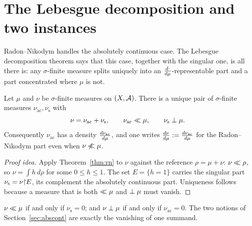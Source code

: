 \section{The Lebesgue decomposition and two instances}
\label{sec:lebesgue}

Radon--Nikodym handles the absolutely continuous case. The Lebesgue
decomposition theorem says that this case, together with the singular one, is
all there is: any $\sigma$-finite measure splits uniquely into an
$\frac{d \cdot}{d \mu}$-representable part and a part concentrated where $\mu$ is not.

\begin{theorem}
\label{thm:lebesgue}
Let $\mu$ and $\nu$ be $\sigma$-finite measures on $(X, \mathcal{A})$. There is a
unique pair of $\sigma$-finite measures $\nu_{\mathrm{ac}}, \nu_{\mathrm{s}}$
with
\begin{equation}
  \nu = \nu_{\mathrm{ac}} + \nu_{\mathrm{s}},
  \qquad \nu_{\mathrm{ac}} \ll \mu,
  \qquad \nu_{\mathrm{s}} \perp \mu.
  \label{eq:lebesgue}
\end{equation}
Consequently $\nu_{\mathrm{ac}}$ has a density $\frac{d \nu_{\mathrm{ac}}}{d \mu}$, and
one writes $\frac{d \nu}{d \mu} := \frac{d \nu_{\mathrm{ac}}}{d \mu}$ for the
Radon--Nikodym part even when $\nu \not\ll \mu$.
\end{theorem}

\begin{proof}[Proof idea]
Apply Theorem~\ref{thm:rn} to $\nu$ against the reference $\rho = \mu + \nu$:
$\nu \ll \rho$, so $\nu = \int h \, d\rho$ for some $0 \le h \le 1$. The set
$E = \{h = 1\}$ carries the singular part $\nu_{\mathrm{s}} = \nu\mathord{\restriction} E$, its
complement the absolutely continuous part. Uniqueness follows because a measure
that is both $\ll \mu$ and $\perp \mu$ must vanish.
\end{proof}

\begin{corollary}
$\nu \ll \mu$ if and only if $\nu_{\mathrm{s}} = 0$; and $\nu \perp \mu$ if
and only if $\nu_{\mathrm{ac}} = 0$. The two notions of
Section~\ref{sec:abscont} are exactly the vanishing of one summand.
\end{corollary}

